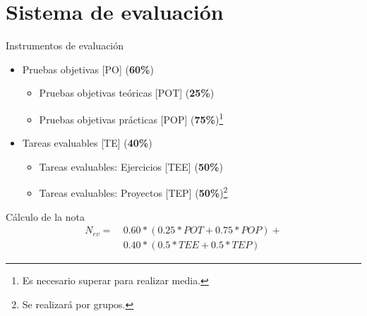 \documentclass{beamer}
\begin{document}
\section{Sistema de evaluación}
\begin{frame}{Instrumentos de evaluación}
    \begin{itemize}
        \item Pruebas objetivas [PO] (\textbf{60\%})
        \begin{itemize}
            \item Pruebas objetivas teóricas [POT] (\textbf{25\%})
            \item Pruebas objetivas prácticas [POP] (\textbf{75\%})\footnote{Es necesario superar para realizar media.}
        \end{itemize}
        \item Tareas evaluables [TE] (\textbf{40\%})
        \begin{itemize}
            \item Tareas evaluables: Ejercicios [TEE] (\textbf{50\%})
            \item Tareas evaluables: Proyectos [TEP] (\textbf{50\%})\footnote{Se realizará por grupos.}
        \end{itemize}
    \end{itemize}


    \begin{block}{\tiny{Cálculo de la nota}}
        \vspace{-2em}
        \begin{align*}
        N_{ev} =\ & 0.60 * (0.25 * POT + 0.75 * POP) +\\
                & 0.40 * (0.5 * TEE + 0.5 * TEP)
        \end{align*}
        \vspace{-2em}
    \end{block}
\end{frame}
\end{document}

